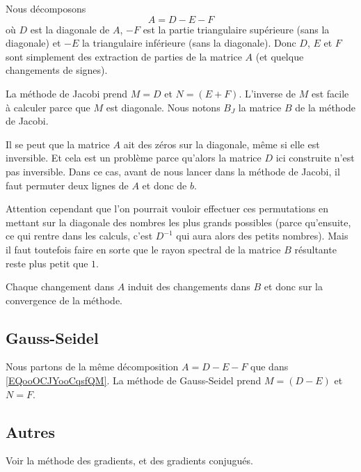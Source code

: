 Nous décomposons  
\begin{equation}        \label{EQooOCJYooCqsfQM}
    A=D-E-F
\end{equation}
où \( D\) est la diagonale de \( A\), \( -F\) est la partie triangulaire supérieure (sans la diagonale) et \( -E\) la triangulaire inférieure (sans la diagonale). Donc \( D\), \( E\) et \( F\) sont simplement des extraction de parties de la matrice \( A\) (et quelque changements de signes).

La méthode de Jacobi prend \( M=D\) et \( N=(E+F)\). L'inverse de \( M\) est facile à calculer parce que \( M\) est diagonale. Nous notons \( B_J\) la matrice \( B\) de la méthode de Jacobi.

\begin{remark}
    Il se peut que la matrice \( A\) ait des zéros sur la diagonale, même si elle est inversible. Et cela est un problème parce qu'alors la matrice \( D\) ici construite n'est pas inversible. Dans ce cas, avant de nous lancer dans la méthode de Jacobi, il faut permuter deux lignes de \( A\) et donc de \( b\).

    Attention cependant que l'on pourrait vouloir effectuer ces permutations en mettant sur la diagonale des nombres les plus grands possibles (parce qu'ensuite, ce qui rentre dans les calculs, c'est \( D^{-1}\) qui aura alors des petits nombres). Mais il faut toutefois faire en sorte que le rayon spectral de la matrice \(B \) résultante reste plus petit que \( 1\).

    Chaque changement dans \( A\) induit des changements dans \( B\) et donc sur la convergence de la méthode.
\end{remark}

\subsection{Gauss-Seidel}

Nous partons de la même décomposition \( A=D-E-F\) que dans \eqref{EQooOCJYooCqsfQM}. La méthode de Gauss-Seidel prend \( M=(D-E)\) et \( N=F\).

\subsection{Autres}

Voir la méthode des gradients, et des gradients conjugués.

